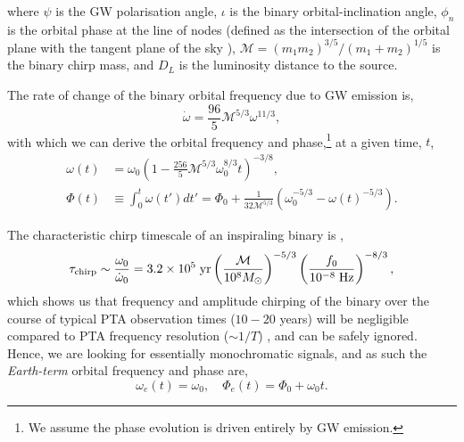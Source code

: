 \documentclass[twocolappendix,tighten]{emulateapj}
\begin{document}
where $\psi$ is the GW polarisation angle, $\iota$ is the binary orbital-inclination angle, $\phi_n$ is the orbital phase at the line of nodes (defined as the intersection of the orbital plane with the tangent plane of the sky \citep{wahlquist-1987}), $\mathcal{M}=(m_1m_2)^{3/5}/(m_1+m_2)^{1/5}$ is the binary chirp mass, and $D_L$ is the luminosity distance to the source. 

The rate of change of the binary orbital frequency due to GW emission is,
\begin{equation}
\dot{\omega} = \frac{96}{5}\mathcal{M}^{5/3}\omega^{11/3},
\end{equation}
with which we can derive the orbital frequency and phase,\footnote{We assume the phase evolution is driven entirely by GW emission.}  at a given time, $t$,
\begin{align} \label{eq:FullFreqPhase}
\omega(t) &= \omega_0\left(1 - \frac{256}{5}\mathcal{M}^{5/3}\omega_0^{8/3}t\right)^{-3/8},\nonumber\\
\Phi(t) &\equiv \int_0^t\omega(t')dt' = \Phi_0 + \frac{1}{32\mathcal{M}^{5/3}}\left(\omega_0^{-5/3} - \omega(t)^{-5/3}\right).
\end{align}

The characteristic chirp timescale of an inspiraling binary is \citep{ellisbayesian2013},
\begin{equation}
\tau_{\rm chirp} \sim \frac{\omega_0}{\dot\omega_0} = 3.2\times 10^5\;{\rm yr}\left(\frac{\mathcal{M}}{10^8M_{\odot}}\right)^{-5/3}\left(\frac{f_0}{10^{-8}\;{\rm Hz}}\right)^{-8/3},
\end{equation}
which shows us that frequency and amplitude chirping of the binary over the course of typical PTA observation times ($10-20$ years) will be negligible compared to PTA frequency resolution ($\sim 1/T$) \citep{yardley-2010,sesana-vecchio-measuring-2010}, and can be safely ignored. Hence, we are looking for essentially monochromatic signals, and as such the {\it Earth-term} orbital frequency and phase are,
\begin{equation}
\omega_e(t) = \omega_0,\quad \Phi_e(t) = \Phi_0 + \omega_0t.
\end{equation}
\end{document}
